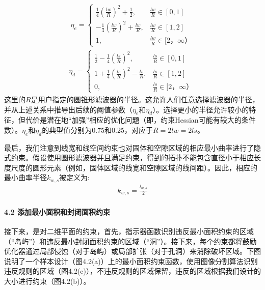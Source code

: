 \documentclass[letterpaper,10pt,english]{sphinxmanual}
\begin{document}
\begin{equation*}
\begin{split}\eta_e = \begin {cases} \frac{1}{4}(\frac{lw}{R})^2+\frac{1}{2}, & \frac{lw}{R}∈[0,1]  \\  -\frac{1}{4}(\frac{lw}{R})^2+\frac{lw}{R}, & \frac{lw}{R}∈[1,2]   \\ 1,   & \frac{lw}{R}∈[2，∞）    \end {cases}\end{split}
\end{equation*}\begin{equation*}
\begin{split}\eta_d = \begin {cases} \frac{1}{2}- \frac{1}{4}(\frac{ls}{R})^2, & \frac{ls}{R}∈[0,1]  \\  1+\frac{1}{4}(\frac{ls}{R})^2-\frac{ls}{R}, & \frac{ls}{R}∈[1,2]   \\ 0,   & \frac{ls}{R}∈[2，∞）    \end {cases}\end{split}
\end{equation*}
\sphinxAtStartPar
这里的\(R\)是用户指定的圆锥形滤波器的半径。这允许人们任意选择滤波器的半径，并从上述关系中推导出后续的阈值参数（\(η_{e}\)和\(η_{d}\)）。选择更小的半径允许较小的特征，但代价是潜在地“加强”相应的优化问题（即，约束Hessian可能有较大的条件数）。\(η_{e}\)和\(η_{d}\)的典型值分别为0.75和0.25，对应于\(R = 2lw = 2ls\)。

\sphinxAtStartPar
最后，我们注意到线宽和线空间约束也对固体和空隙区域的相应最小曲率进行了隐式约束。假设使用圆形滤波器并且满足约束，得到的拓扑不能包含直径小于相应长度尺度的圆形元素（例如，固体区域的线宽和空隙区域的线间距）。因此，相应的最小曲率半径\(k_{w,s}\)被定义为:
\begin{equation*}
\begin{split}k_{w,s} = \frac{l_{w,s} }{2}\end{split}
\end{equation*}

\paragraph{4.2 添加最小面积和封闭面积约束}
\label{\detokenize{_u7b80_u4ecb/_u6838_u5fc3_u8bbe_u8ba1_u4f18_u5316_u7b97_u6cd5/_u68af_u5ea6_u62d3_u6251_u4f18_u5316_u6a21_u5757/_u68af_u5ea6_u62d3_u6251_u4f18_u5316_u7b97_u6cd5:id16}}
\sphinxAtStartPar
接下来，是对二维平面的约束，首先，指示器函数识别违反最小面积约束的区域（“岛屿”）和违反最小封闭面积约束的区域（“洞”）。接下来，每个约束都将鼓励优化器通过局部侵蚀（对于岛屿）或局部扩张（对于孔洞）来消除破坏区域。下图说明了一个样本设计（图4.2(a)）上的最小面积约束函数，使用图像分割算法识别违反规则的区域（图4.2(c)），不违反规则的区域保留，违反的区域根据我们设计的大小进行约束（图4.2(b)）。
\end{document}
